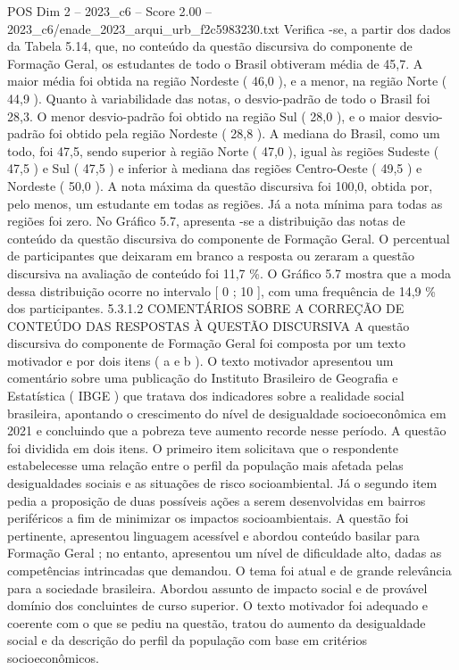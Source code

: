 \begin{textsample}{POS Dim 2 – 2023\_c6 – Score 2.00 – 2023\_c6/enade\_2023\_arqui\_urb\_f2c5983230.txt}
Verifica -se, a partir dos dados da Tabela 5.14, que, no conteúdo da questão discursiva do componente de Formação Geral, os estudantes de todo o Brasil obtiveram média de 45,7.
A maior média foi obtida na região Nordeste ( 46,0 ), e a menor, na região Norte ( 44,9 ).
Quanto à variabilidade das notas, o desvio-padrão de todo o Brasil foi 28,3.
O menor desvio-padrão foi obtido na região Sul ( 28,0 ), e o maior desvio-padrão foi obtido pela região Nordeste ( 28,8 ).
A mediana do Brasil, como um todo, foi 47,5, sendo superior à região Norte ( 47,0 ), igual às regiões Sudeste ( 47,5 ) e Sul ( 47,5 ) e inferior à mediana das regiões Centro-Oeste ( 49,5 ) e Nordeste ( 50,0 ).
A nota máxima da questão discursiva foi 100,0, obtida por, pelo menos, um estudante em todas as regiões.
Já a nota mínima para todas as regiões foi zero.
No Gráfico 5.7, apresenta -se a distribuição das notas de conteúdo da questão discursiva do componente de Formação Geral.
O percentual de participantes que deixaram em branco a resposta ou zeraram a questão discursiva na avaliação de conteúdo foi 11,7 \%.
O Gráfico 5.7 mostra que a moda dessa distribuição ocorre no intervalo [ 0 ; 10 ], com uma frequência de 14,9 \% dos participantes. 5.3.1.2 COMENTÁRIOS SOBRE A CORREÇÃO DE CONTEÚDO DAS RESPOSTAS À QUESTÃO DISCURSIVA A questão discursiva do componente de Formação Geral foi composta por um texto motivador e por dois itens ( a e b ).
O texto motivador apresentou um comentário sobre uma publicação do Instituto Brasileiro de Geografia e Estatística ( IBGE ) que tratava dos indicadores sobre a realidade social brasileira, apontando o crescimento do nível de desigualdade socioeconômica em 2021 e concluindo que a pobreza teve aumento recorde nesse período.
A questão foi dividida em dois itens.
O primeiro item solicitava que o respondente estabelecesse uma relação entre o perfil da população mais afetada pelas desigualdades sociais e as situações de risco socioambiental.
Já o segundo item pedia a proposição de duas possíveis ações a serem desenvolvidas em bairros periféricos a fim de minimizar os impactos socioambientais.
A questão foi pertinente, apresentou linguagem acessível e abordou conteúdo basilar para Formação Geral ; no entanto, apresentou um nível de dificuldade alto, dadas as competências intrincadas que demandou.
O tema foi atual e de grande relevância para a sociedade brasileira.
Abordou assunto de impacto social e de provável domínio dos concluintes de curso superior.
O texto motivador foi adequado e coerente com o que se pediu na questão, tratou do aumento da desigualdade social e da descrição do perfil da população com base em critérios socioeconômicos.

\end{textsample}
